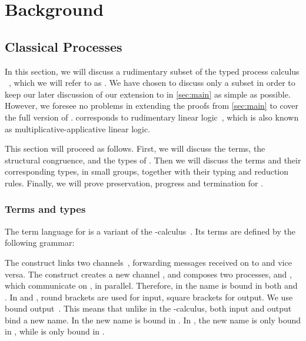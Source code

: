 \chapter{Background}\label{sec:background}
\section{Classical Processes}\label{sec:cp}
In this section, we will discuss a rudimentary subset of the typed process
calculus \cp~\cite{wadler2012}, which we will refer to as \rcp.
We have chosen to discuss only a subset in order to keep our later discussion of
our extension to \cp in \cref{sec:main} as simple as possible.
However, we foresee no problems in extending the proofs from \cref{sec:main} to
cover the full version of \cp.
\rcp corresponds to rudimentary linear logic~\cite[RLL]{girard1992}, which is
also known as multiplicative-applicative linear logic.

This section will proceed as follows. First, we will discuss the terms, the
structural congruence, and the types of \rcp.
Then we will discuss the terms and their corresponding types, in small groups,
together with their typing and reduction rules.
Finally, we will prove preservation, progress and termination for \rcp.

\subsection{Terms and types}\label{sec:cp:terms-and-types}
The term language for \rcp is a variant of the
\textpi-calculus~\cite{milner1992b}.
Its terms are defined by the following grammar:

The construct  links two
channels~\cite{sangiorgi1996,boreale1998}, forwarding messages received on
 to  and vice versa.
The construct  creates a new channel , and composes
two processes,  and , which communicate on , in parallel.
Therefore, in  the name  is bound in both  and
.
In  and , round brackets are used
for input, square brackets for output.
We use bound output~\cite{sangiorgi1996}.
This means that unlike in the \textpi-calculus, both input and output bind a new
name.
In  the new name  is bound in .
In , the new name  is only bound in , while
 is only bound in .

